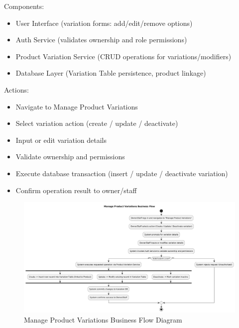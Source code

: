 \documentclass[]{VUMIFTemplateClass}
\begin{document}
Components:
\begin{itemize}
\setlength{\itemsep}{2pt}
\setlength{\parskip}{0pt}
\setlength{\parsep}{0pt}
\item User Interface (variation forms: add/edit/remove options)
\item Auth Service (validates ownership and role permissions)
\item Product Variation Service (CRUD operations for variations/modifiers)
\item Database Layer (Variation Table persistence, product linkage)
\end{itemize}

Actions:
\begin{itemize}
\setlength{\itemsep}{2pt}
\setlength{\parskip}{0pt}
\setlength{\parsep}{0pt}
\item Navigate to Manage Product Variations
\item Select variation action (create / update / deactivate)
\item Input or edit variation details
\item Validate ownership and permissions
\item Execute database transaction (insert / update / deactivate variation)
\item Confirm operation result to owner/staff
\end{itemize}

\begin{figure}[H]
    \centering
    \includegraphics[width=1\textwidth]{docs/ps-design/design-document/diagrams/business/bpmn_product_variations.png}
    \caption{Manage Product Variations Business Flow Diagram}
    \label{fig:product_variations_manage_flow}
\end{figure}
\end{document}
